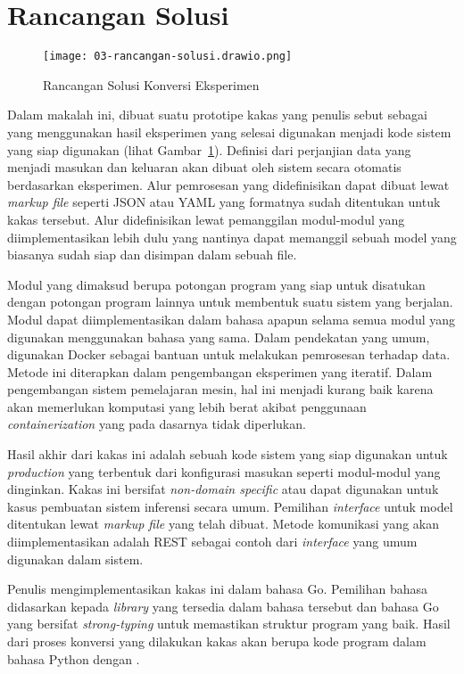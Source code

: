 \section{Rancangan Solusi}

\begin{figure}[ht]
  \centering
  \texttt{[image: 03-rancangan-solusi.drawio.png]}
  \caption{Rancangan Solusi Konversi Eksperimen}\label{fig:03-tool}
\end{figure}

Dalam makalah ini, dibuat suatu prototipe kakas yang penulis sebut sebagai  yang menggunakan hasil eksperimen yang selesai digunakan menjadi kode sistem yang siap digunakan (lihat Gambar~\ref{fig:03-tool}).
Definisi dari perjanjian data yang menjadi masukan dan keluaran akan dibuat oleh sistem secara otomatis berdasarkan eksperimen.
Alur pemrosesan yang didefinisikan dapat dibuat lewat \textit{markup file} seperti JSON atau YAML yang formatnya sudah ditentukan untuk kakas tersebut.
Alur didefinisikan lewat pemanggilan modul-modul yang diimplementasikan lebih dulu yang nantinya dapat memanggil sebuah model yang biasanya sudah siap dan disimpan dalam sebuah file.

Modul yang dimaksud berupa potongan program yang siap untuk disatukan dengan potongan program lainnya untuk membentuk suatu sistem yang berjalan.
Modul dapat diimplementasikan dalam bahasa apapun selama semua modul yang digunakan menggunakan bahasa yang sama.
Dalam pendekatan yang umum, digunakan Docker sebagai bantuan untuk melakukan pemrosesan terhadap data.
Metode ini diterapkan dalam pengembangan eksperimen yang iteratif.
Dalam pengembangan sistem pemelajaran mesin, hal ini menjadi kurang baik karena akan memerlukan komputasi yang lebih berat akibat penggunaan \textit{containerization} yang pada dasarnya tidak diperlukan.

Hasil akhir dari kakas ini adalah sebuah kode sistem yang siap digunakan untuk \textit{production} yang terbentuk dari konfigurasi masukan seperti modul-modul yang dinginkan.
Kakas ini bersifat \textit{non-domain specific} atau dapat digunakan untuk kasus pembuatan sistem inferensi secara umum.
Pemilihan \textit{interface} untuk model ditentukan lewat \textit{markup file} yang telah dibuat.
Metode komunikasi yang akan diimplementasikan adalah REST sebagai contoh dari \textit{interface} yang umum digunakan dalam sistem.

Penulis mengimplementasikan kakas ini dalam bahasa Go.
Pemilihan bahasa didasarkan kepada \textit{library} yang tersedia dalam bahasa tersebut dan bahasa Go yang bersifat \textit{strong-typing} untuk memastikan struktur program yang baik.
Hasil dari proses konversi yang dilakukan kakas akan berupa kode program dalam bahasa Python dengan .

